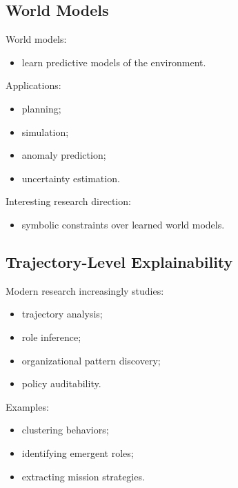 \documentclass[10pt,a4paper,twocolumn]{article}
\begin{document}

\subsection{World Models}

World models:
\begin{itemize}
    \item learn predictive models of the environment.
\end{itemize}

Applications:
\begin{itemize}
    \item planning;
    \item simulation;
    \item anomaly prediction;
    \item uncertainty estimation.
\end{itemize}

Interesting research direction:
\begin{itemize}
    \item symbolic constraints over learned world models.
\end{itemize}


\subsection{Trajectory-Level Explainability}

Modern research increasingly studies:
\begin{itemize}
    \item trajectory analysis;
    \item role inference;
    \item organizational pattern discovery;
    \item policy auditability.
\end{itemize}

Examples:
\begin{itemize}
    \item clustering behaviors;
    \item identifying emergent roles;
    \item extracting mission strategies.
\end{itemize}
\end{document}
